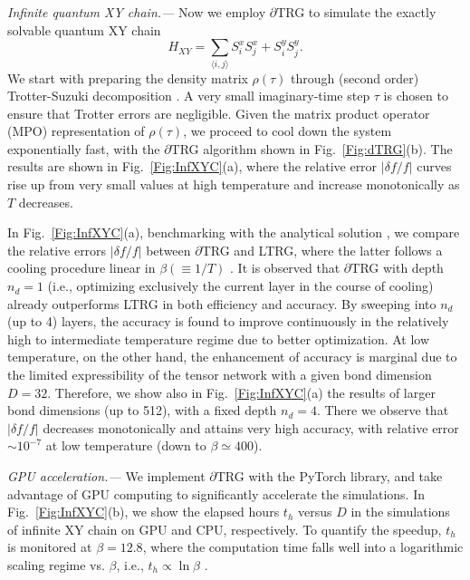 \documentclass[aps,prx,twocolumn,showpacs,psfig,superscriptaddress,longbibliography]{revtex4-1}
\newcommand{\Fig}[1]{Fig.~\ref{#1}}
\def\dTRG{$\partial$TRG\xspace}
\begin{document}
\textit{Infinite quantum XY chain.---} 
Now we employ $\partial$TRG to simulate the 
exactly solvable quantum XY chain 
\begin{equation}
H_{XY} = \sum_{\langle i,j \rangle} S_i^x S_j^x + S_i^y S_j^y. 
\end{equation}
We start with preparing the density matrix $\rho(\tau)$ through (second order) Trotter-Suzuki decomposition \cite{SM}. 
A very small imaginary-time step $\tau$ is chosen to ensure that Trotter errors are negligible. 
Given the matrix product operator (MPO) representation of $\rho(\tau)$, 
we proceed to cool down the system exponentially fast, with the \dTRG algorithm shown in \Fig{Fig:dTRG}(b). 
The results are shown in \Fig{Fig:InfXYC}(a), where the relative error $|\delta f/f|$ curves rise up from very small values 
at high temperature and increase monotonically as $T$ decreases. 

In \Fig{Fig:InfXYC}(a), benchmarking with the analytical solution \cite{Tu-CFT2017, Chen-CFT2017, SM}, we compare the relative errors $|\delta f/f|$ between \dTRG and LTRG, 
where the latter follows a cooling procedure linear in $\beta (\equiv 1/T)$ \cite{Li.w+:2011:LTRG}. 
It is observed that $\partial$TRG with depth $n_d=1$ (i.e., optimizing exclusively the current layer in the course of cooling) 
already outperforms LTRG in both efficiency and accuracy. By sweeping into $n_d$ (up to 4) layers, the 
accuracy is found to improve continuously in the relatively high to intermediate temperature regime due to better optimization. 
At low temperature, on the other hand, the enhancement of accuracy is marginal due to the limited expressibility 
of the tensor network with a given bond dimension $D=32$. Therefore, we show also in \Fig{Fig:InfXYC}(a) 
the results of larger bond dimensions (up to 512), with a fixed depth $n_d=4$. There we observe that $|\delta f/f|$ 
decreases monotonically and attains very high accuracy, with relative error 
$\sim 10^{-7}$ at low temperature (down to $\beta \simeq 400$).

\textit{GPU acceleration.---} We implement $\partial$TRG with the PyTorch library, 
and take advantage of GPU computing to significantly accelerate the simulations. 
In \Fig{Fig:InfXYC}(b), we show the elapsed hours $t_h$ versus $D$ in the simulations 
of infinite XY chain on GPU and CPU, respectively. To quantify the speedup, $t_h$ is monitored at $\beta=12.8$, 
where the computation time falls well into a logarithmic scaling regime vs. $\beta$, i.e., $t_h \propto \ln{\beta}$ \cite{SM}.
\end{document}
